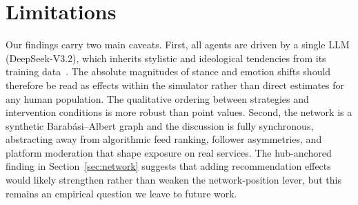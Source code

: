 \section{Limitations}
\label{sec:limitations}

Our findings carry two main caveats. First, all agents are driven by a single LLM (DeepSeek-V3.2), which inherits stylistic and ideological tendencies from its training data~\citep{taubenfeld-etal-2024-systematic}. The absolute magnitudes of stance and emotion shifts should therefore be read as effects within the simulator rather than direct estimates for any human population. The qualitative ordering between strategies and intervention conditions is more robust than point values. Second, the network is a synthetic Barab\'{a}si--Albert graph and the discussion is fully synchronous, abstracting away from algorithmic feed ranking, follower asymmetries, and platform moderation that shape exposure on real services. The hub-anchored finding in Section~\ref{sec:network} suggests that adding recommendation effects would likely strengthen rather than weaken the network-position lever, but this remains an empirical question we leave to future work.
